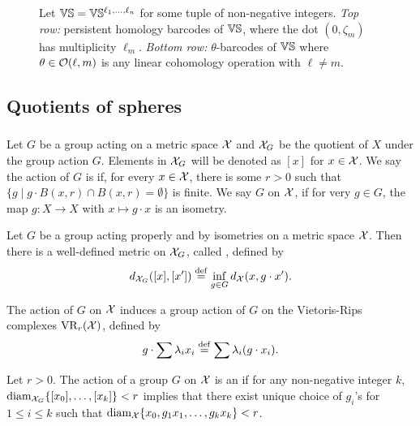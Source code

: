 
\begin{figure}
	\centering
	
	\caption{Let $\mathbb{V}\mathbb{S} = \mathbb{V}\mathbb{S}^{\ell_1,\dots,\ell_n}$ for some tuple of non-negative integers.
	\emph{Top row:} persistent homology barcodes of $\mathbb{V}\mathbb{S}$, where the dot $(0,\zeta_m)$ has multiplicity $\ell_m$.
	\emph{Bottom row:} $\theta$-barcodes of $\mathbb{V}\mathbb{S}$ where $\theta \in \mathcal{O}(\ell,m)$ is any linear cohomology operation with \(\ell \neq m\).}
	\label{fig:barcodes_vs}
\end{figure}


\subsection{Quotients of spheres}

\subsubsection{}


Let $G$ be a group acting on a metric space $\mathcal{X}$ and $\mathcal{X}_G$ be the quotient of $X$ under the group action $G$. 
Elements in $\mathcal{X}_G$ will be denoted as $[x]$ for $x\in \mathcal{X}$.
We say the action of $G$ is  if, for every $x\in \mathcal{X}$, there is some $r>0$ such that $\{g \mid g\cdot B(x,r)\cap B(x,r)=\emptyset\}$ is finite. 
We say $G$  on $\mathcal{X}$, if for very $g\in G$, the map $g:X\to X$ with $x\mapsto g\cdot x$ is an isometry.

Let $G$ be a group acting properly and by isometries on a metric space $\mathcal{X}$.
Then there is a well-defined metric on $\mathcal{X}_G$, called , defined by 
\[
    d_{\mathcal{X}_G}([x], [x']) \stackrel{\mathrm{def}}{=} \inf_{g\in G} d_{\mathcal{X}}(x, g\cdot x').
\]

The action of $G$ on $\mathcal{X}$ induces a group action of $G$ on the Vietoris-Rips complexes $\operatorname{VR}_r(\mathcal{X})$, defined by
\[
    g \cdot \sum \lambda_i x_i \stackrel{\mathrm{def}}{=} \sum \lambda_i (g\cdot x_i).
\]

Let $r>0$. The action of a group $G$ on $\mathcal{X}$ is an  if for any non-negative integer $k$, $\operatorname{diam}_{\mathcal{X}_G}\{[x_0],\dots,[x_k]\}<r$ implies that there exist unique choice of $g_i$'s for $1\leq i\leq k$ such that $\operatorname{diam}_{\mathcal{X}}\{x_0,g_1x_1,\dots,g_kx_k\}<r$. 

